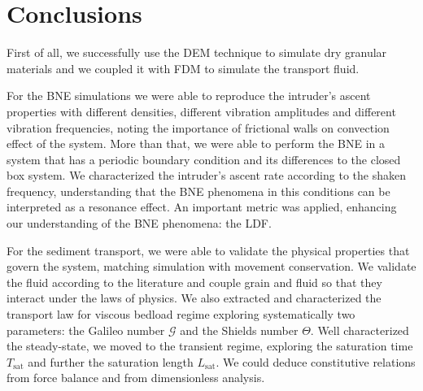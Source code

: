 
\chapter{Conclusions}
\label{chap:Conclusao}
    First of all, we successfully use the DEM technique to simulate dry granular materials and we coupled it with FDM to simulate the transport fluid.

    For the BNE simulations we were able to reproduce the intruder's ascent properties with different densities, different vibration amplitudes and different vibration frequencies, noting the importance of frictional walls on convection effect of the system. More than that, we were able to perform the BNE in a system that has a periodic boundary condition and its differences to the closed box system. We characterized the intruder's ascent rate according to the shaken frequency, understanding that the BNE phenomena in this conditions can be interpreted as a resonance effect. An important metric was applied, enhancing our understanding of the BNE phenomena: the LDF.


    For the sediment transport, we were able to validate the physical properties that govern the system, matching simulation with movement conservation. We validate the fluid according to the literature and couple grain and fluid so that they interact under the laws of physics. We also extracted and characterized the transport law for viscous bedload regime exploring systematically two parameters: the Galileo number $\mathcal{G}$ and the Shields number $\Theta$. Well characterized the steady-state, we moved to the transient regime, exploring the saturation time $T_\textrm{sat}$ and further the saturation length $L_\textrm{sat}$. We could deduce constitutive relations from force balance and from dimensionless analysis.

